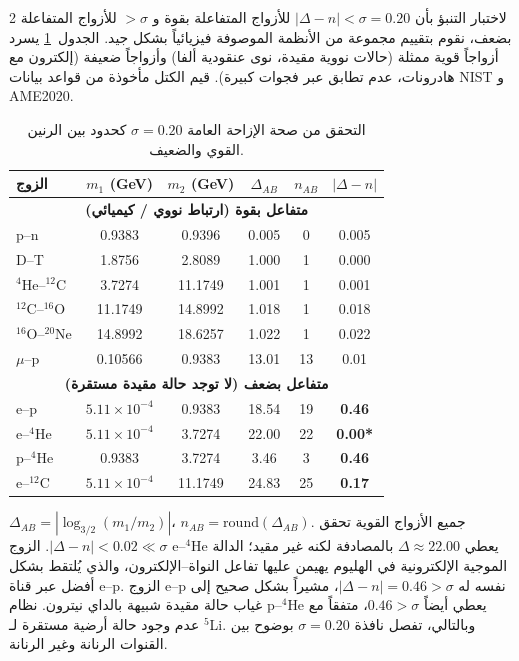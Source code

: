 \documentclass[11pt,a4paper]{article}
\begin{document}
\begin{multicols}{2}
		لاختبار التنبؤ بأن \(|\Delta - n| < \sigma = 0.20\) للأزواج المتفاعلة بقوة و \(> \sigma\) للأزواج المتفاعلة بضعف، نقوم بتقييم مجموعة من الأنظمة الموصوفة فيزيائياً بشكل جيد. الجدول~\ref{tab:sigma_validation} يسرد أزواجاً قوية ممثلة (حالات نووية مقيدة، نوى عنقودية ألفا) وأزواجاً ضعيفة (إلكترون مع هادرونات، عدم تطابق عبر فجوات كبيرة). قيم الكتل مأخوذة من قواعد بيانات NIST و AME2020.
		
		\begin{table}[H]
			\centering
			\caption{التحقق من صحة الإزاحة العامة \(\sigma = 0.20\) كحدود بين الرنين القوي والضعيف.}
			\label{tab:sigma_validation}
			\small
			\begin{tabular}{l c c c c c}
				\toprule
				الزوج & $m_1$ (GeV) & $m_2$ (GeV) & $\Delta_{AB}$ & $n_{AB}$ & $|\Delta - n|$ \\
				\midrule
				\multicolumn{6}{c}{\textbf{متفاعل بقوة (ارتباط نووي / كيميائي)}} \\
				p--n           & 0.9383 & 0.9396 & 0.005  & 0 & 0.005 \\
				D--T           & 1.8756 & 2.8089 & 1.000  & 1 & 0.000 \\
				$^4$He--$^{12}$C  & 3.7274 & 11.1749 & 1.001  & 1 & 0.001 \\
				$^{12}$C--$^{16}$O & 11.1749& 14.8992 & 1.018  & 1 & 0.018 \\
				$^{16}$O--$^{20}$Ne& 14.8992& 18.6257 & 1.022  & 1 & 0.022 \\
				$\mu$--p        & 0.10566& 0.9383 & 13.01  &13 & 0.01  \\
				\midrule
				\multicolumn{6}{c}{\textbf{متفاعل بضعف (لا توجد حالة مقيدة مستقرة)}} \\
				e--p           & $5.11\times10^{-4}$ & 0.9383 & 18.54 & 19 & \textbf{0.46} \\
				e--$^4$He      & $5.11\times10^{-4}$ & 3.7274 & 22.00 & 22 & \textbf{0.00*} \\
				p--$^4$He      & 0.9383 & 3.7274 & 3.46  & 3  & \textbf{0.46} \\
				e--$^{12}$C    & $5.11\times10^{-4}$ & 11.1749& 24.83 & 25 & \textbf{0.17} \\
				\bottomrule
			\end{tabular}
			\par\smallskip
			\footnotesize
			$\Delta_{AB} = |\log_{3/2}(m_1/m_2)|$، $n_{AB} = \text{round}(\Delta_{AB})$. جميع الأزواج القوية تحقق $|\Delta - n| < 0.02 \ll \sigma$. الزوج e--$^4$He يعطي $\Delta \approx 22.00$ بالمصادفة لكنه غير مقيد؛ الدالة الموجية الإلكترونية في الهليوم يهيمن عليها تفاعل النواة–الإلكترون، والذي يُلتقط بشكل أفضل عبر قناة e--p. الزوج e--p نفسه له $|\Delta - n| = 0.46 > \sigma$، مشيراً بشكل صحيح إلى غياب حالة مقيدة شبيهة بالداي نيترون. نظام p--$^4$He يعطي أيضاً $0.46 > \sigma$، متفقاً مع عدم وجود حالة أرضية مستقرة لـ $^5$Li. وبالتالي، تفصل نافذة $\sigma = 0.20$ بوضوح بين القنوات الرنانة وغير الرنانة.
		\end{table}
		

\end{multicols}
\end{document}
